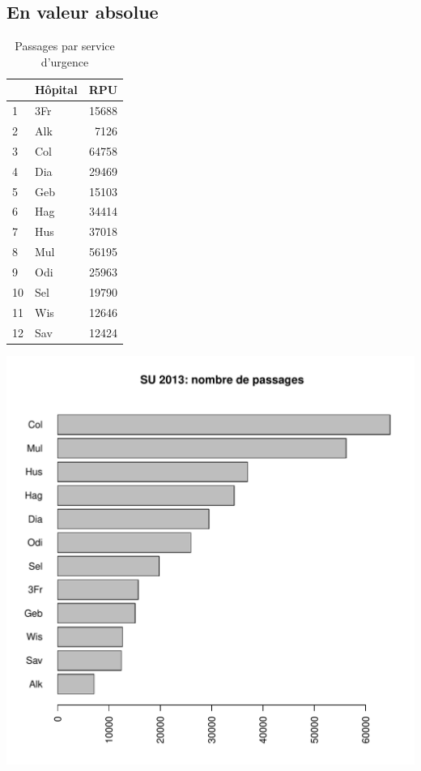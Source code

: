 \documentclass[12pt,english,french,twoside]{report}\usepackage[]{graphicx}\usepackage[]{color}
\makeatletter
\def\maxwidth{ %
  \ifdim\Gin@nat@width>\linewidth
    \linewidth
  \else
    \Gin@nat@width
  \fi
}
\makeatother
\begin{document}
\subsection*{En valeur absolue}
\begin{table}[ht]
\centering
\begin{tabular}{llr}
  \hline
 & Hôpital & RPU \\ 
  \hline
1 & 3Fr & 15688 \\ 
  2 & Alk & 7126 \\ 
  3 & Col & 64758 \\ 
  4 & Dia & 29469 \\ 
  5 & Geb & 15103 \\ 
  6 & Hag & 34414 \\ 
  7 & Hus & 37018 \\ 
  8 & Mul & 56195 \\ 
  9 & Odi & 25963 \\ 
  10 & Sel & 19790 \\ 
  11 & Wis & 12646 \\ 
  12 & Sav & 12424 \\ 
   \hline
\end{tabular}
\caption[Nombre de passages par service d'urgence]{Passages par service d'urgence} 
\label{fig:passage_su}
\end{table}

\includegraphics[width=\maxwidth]{figure/val_abs} 
\end{document}
